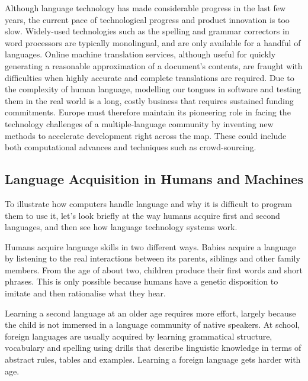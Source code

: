 \begin{multicols}{2}
    Although language technology has made considerable progress in the last few years, the current pace of technological progress and product innovation is too slow. 
Widely-used technologies such as the spelling and grammar correctors in word processors are typically monolingual, and are only available for a handful of languages. Online machine translation services, although useful for quickly generating a reasonable approximation of a document’s contents, are fraught with difficulties when highly accurate and complete translations are required. Due to the complexity of human language, modelling our tongues in software and testing them in the real world is a long, costly business that requires sustained funding commitments. Europe must therefore maintain its pioneering role in facing the technology challenges of a multiple-language community by inventing new methods to accelerate development right across the map. These could include both computational advances and techniques such as crowd-sourcing.


\subsection{Language Acquisition in Humans and Machines}

    To illustrate how computers handle language and why it is difficult to program them to use it, let’s look briefly at the way humans acquire first and second languages, and then see how language technology systems work. 

    Humans acquire language skills in two different ways. Babies acquire a language by listening to the real interactions between its parents, siblings and other family members. From the age of about two, children produce their first words and short phrases. This is only possible because humans have a genetic disposition to imitate and then rationalise what they hear. 

    Learning a second language at an older age requires more effort, largely because the child is not immersed in a language community of native speakers. At school, foreign languages are usually acquired by learning grammatical structure, vocabulary and spelling using drills that describe linguistic knowledge in terms of abstract rules, tables and examples. Learning a foreign language gets harder with age.


\end{multicols}
